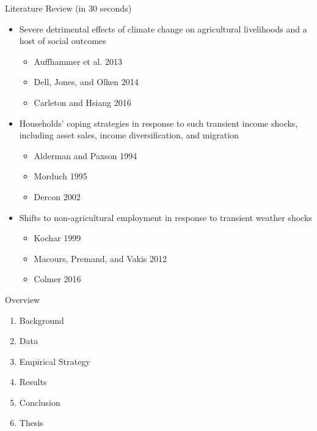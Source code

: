 \documentclass[10pt]{beamer}
\begin{document}
\begin{frame}
	{Literature Review (in 30 seconds)}
	\begin{itemize}
		\item Severe detrimental effects of climate change on agricultural livelihoods and a host of social outcomes
		      \begin{itemize}
			      \item Auffhammer et al. 2013
			      \item Dell, Jones, and Olken 2014
			      \item Carleton and Hsiang 2016
		      \end{itemize}
		\item Households' coping strategies in response to such transient income shocks, including asset sales, income diversification, and migration
		      \begin{itemize}
			      \item Alderman and Paxson 1994
			      \item Morduch 1995
			      \item Dercon 2002
		      \end{itemize}
		\item Shifts to non-agricultural employment in response to transient weather shocks
		      \begin{itemize}
			      \item Kochar 1999
			      \item Macours, Premand, and Vakis 2012
			      \item Colmer 2016
		      \end{itemize}
	\end{itemize}
\end{frame}
\begin{frame}
	{Overview}
	\begin{enumerate}
		\item Background
		\item Data
		\item Empirical Strategy
		\item Results
		\item Conclusion
		\item Thesis
	\end{enumerate}
\end{frame}
\end{document}
